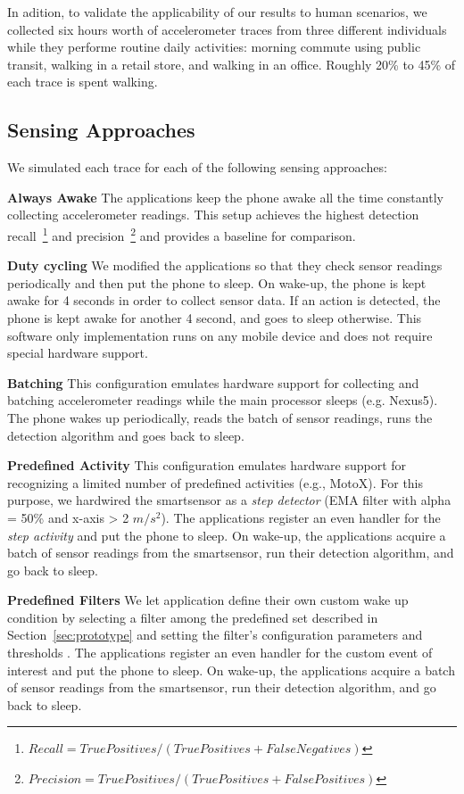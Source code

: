 In adition, to validate the applicability of our results to human
scenarios, we collected six hours worth of accelerometer traces from
three different individuals while they performe routine daily
activities: morning commute using public transit, walking in a retail
store, and walking in an office.  Roughly 20\% to 45\% of each trace
is spent walking.

\subsection{Sensing Approaches}

We simulated each trace for each of the following sensing approaches:

\textbf{Always Awake} The applications keep the phone awake all the
time constantly collecting accelerometer readings.  This setup
achieves the highest detection
recall~\footnote{$Recall=TruePositives/(TruePositives+FalseNegatives)$}
and
precision~\footnote{$Precision=TruePositives/(TruePositives+FalsePositives)$}
and provides a baseline for comparison.

\textbf{Duty cycling} We modified the applications so that they check
sensor readings periodically and then put the phone to sleep.  On
wake-up, the phone is kept awake for 4 seconds in order to collect
sensor data.  If an action is detected, the phone is kept awake for
another 4 second, and goes to sleep otherwise.  This software only
implementation runs on any mobile device and does not require special
hardware support.

\textbf{Batching} This configuration emulates hardware support for
collecting and batching accelerometer readings while the main
processor sleeps (e.g. Nexus5).  The phone wakes up periodically,
reads the batch of sensor readings, runs the detection algorithm and
goes back to sleep.

\textbf{Predefined Activity} This configuration emulates hardware
support for recognizing a limited number of predefined activities
(e.g., MotoX).  For this purpose, we hardwired the smartsensor as a
{\em step detector} (EMA filter with alpha = 50\% and x-axis > 2
$m/s^2$).  The applications register an even handler for the {\em step
  activity} and put the phone to sleep.  On wake-up, the applications
acquire a batch of sensor readings from the smartsensor, run their
detection algorithm, and go back to sleep.

\textbf{Predefined Filters} We let application define their own custom
wake up condition by selecting a filter among the predefined set described
in Section~\ref{sec:prototype} and setting the filter's configuration
parameters and thresholds .  The applications register an even handler
for the custom event of interest and put the phone to sleep.  On
wake-up, the applications acquire a batch of sensor readings from the
smartsensor, run their detection algorithm, and go back to sleep.

